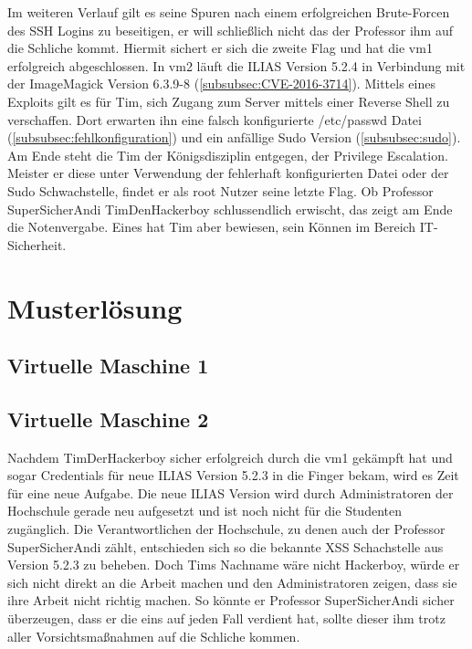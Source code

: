 \documentclass[10pt, a4paper,onecolumn ,titlepage]{article}
\begin{document}
    Im weiteren Verlauf gilt es seine Spuren nach einem erfolgreichen Brute-Forcen des SSH Logins zu beseitigen, er will schließlich nicht das der Professor ihm auf die Schliche kommt.
    Hiermit sichert er sich die zweite Flag und hat die \ac{vm}1 erfolgreich abgeschlossen.
    In \ac{vm}2 läuft die ILIAS Version 5.2.4 in Verbindung mit der ImageMagick Version 6.3.9-8 (\ref{subsubsec:CVE-2016-3714}).
    Mittels eines Exploits gilt es für Tim, sich Zugang zum Server mittels einer Reverse Shell zu verschaffen.
    Dort erwarten ihn eine falsch konfigurierte /etc/passwd Datei (\ref{subsubsec:fehlkonfiguration}) und ein anfällige Sudo Version (\ref{subsubsec:sudo}).
    Am Ende steht die Tim der Königsdisziplin entgegen, der Privilege Escalation.
    Meister er diese unter Verwendung der fehlerhaft konfigurierten Datei oder der Sudo Schwachstelle, findet er als root Nutzer seine letzte Flag.
    Ob Professor SuperSicherAndi TimDenHackerboy schlussendlich erwischt, das zeigt am Ende die Notenvergabe.
    Eines hat Tim aber bewiesen, sein Können im Bereich IT-Sicherheit.



    \section{Musterlösung}
    \label{sec:musterloesung}

    \subsection{Virtuelle Maschine 1}
    \label{subsec:vm1}

    \subsection{Virtuelle Maschine 2}
    \label{subsec:vm2}
    Nachdem TimDerHackerboy sicher erfolgreich durch die \ac{vm}1 gekämpft hat und sogar Credentials für neue ILIAS Version 5.2.3 in die Finger bekam, wird es Zeit für eine neue Aufgabe.
    Die neue ILIAS Version wird durch Administratoren der Hochschule gerade neu aufgesetzt und ist noch nicht für die Studenten zugänglich.
    Die Verantwortlichen der Hochschule, zu denen auch der Professor SuperSicherAndi zählt, entschieden sich so die bekannte XSS Schachstelle aus Version 5.2.3 zu beheben.
    Doch Tims Nachname wäre nicht Hackerboy, würde er sich nicht direkt an die Arbeit machen und den Administratoren zeigen, dass sie ihre Arbeit nicht richtig machen.
    So könnte er Professor SuperSicherAndi sicher überzeugen, dass er die eins auf jeden Fall verdient hat, sollte dieser ihm trotz aller Vorsichtsmaßnahmen auf die Schliche kommen.
\end{document}
